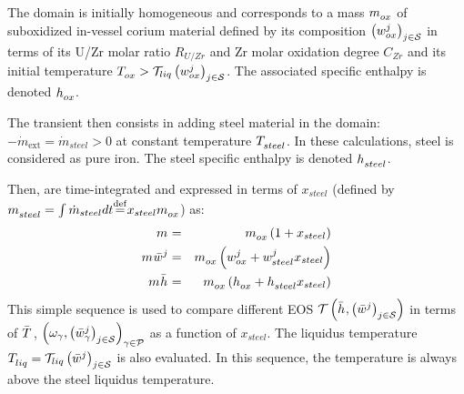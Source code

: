 The domain is initially homogeneous and corresponds to a mass $\mass{ox}$ of suboxidized in-vessel corium material defined by its composition $\left(\massFraction[j]{ox}\right)_{j\in \speciesSet}$ in terms of its U/Zr molar ratio $R_{U/Zr}$ and Zr molar oxidation degree $C_{Zr}$ and its initial temperature $\temperature{ox} > \Mc{T}_{liq}\left(\massFraction[j]{ox}\right)_{j\in \speciesSet}$. The associated specific enthalpy is denoted $\massEnthalpy{ox}$.

The transient then consists in adding steel material in the domain: $- \dot{m}_{\textrm{ext}} = \dot{m}_{steel} >0$ at constant temperature $\temperature{steel}$. In these calculations, steel is considered as pure iron. The steel specific enthalpy is denoted $\massEnthalpy{steel}$.

Then,  are time-integrated and expressed in terms of $x_{steel}$ (defined by $\mass{steel} = \int \dot{m}_{steel} dt {\buildrel\rm def\over=} x_{steel}\mass{ox}$) as:
\begin{eqnarray}
 \mass{} &=& \mass{ox} \left(1 + x_{steel}\right) \\
 \mass{} \avMassFraction[j]{} &=& \mass{ox} \left(\massFraction[j]{ox} + \massFraction[j]{steel} x_{steel}\right) \\
 \mass{} \avMassEnthalpy{} &=& \mass{ox} \left(\massEnthalpy{ox} + \massEnthalpy{steel} x_{steel}\right)
\end{eqnarray}
This simple sequence is used to compare different EOS $\Mc{T}\left(\avMassEnthalpy{}, \left(\avMassFraction[j]{}\right)_{j\in \speciesSet}\right)$ in terms of $\avTemperature{}$, $\left(\omega_\gamma, \left(\avMassFraction[j]{\gamma}\right)_{j\in \speciesSet}\right)_{\gamma \in \phaseSet}$ as a function of $x_{steel}$. The liquidus temperature $\temperature{liq} = \Mc{T}_{liq}\left(\avMassFraction[j]{}\right)_{j\in \speciesSet}$ is also evaluated. In this sequence, the temperature is always above the steel liquidus temperature. 

